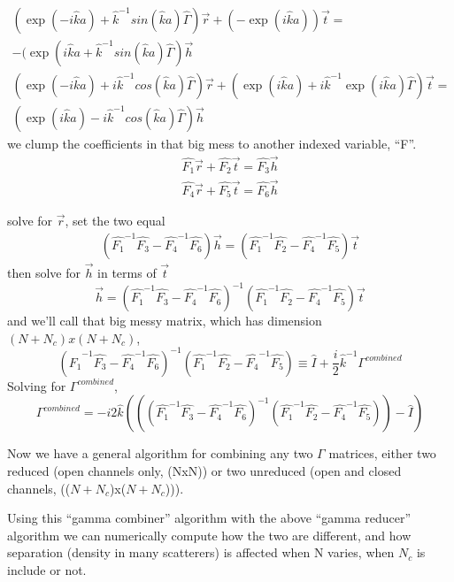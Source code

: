 \begin{equation}
\begin{gathered}
(\exp(-i \hat{k} a)+\hat{k}^{-1} sin(\hat{k} a) \hat{\Gamma}) \vec{r} + 
(-\exp(i \hat{k} a)) \vec{t} = \\
-(\exp(i \hat{k} a +\hat{k}^{-1} sin(\hat{k} a) \hat{\Gamma}) \vec{h}\\
(\exp(-i \hat{k} a)+i \hat{k}^{-1} cos(\hat{k} a) \hat{\Gamma}) \vec{r} + 
(\exp(i \hat{k} a)+i \hat{k}^{-1} \exp(i \hat{k} a) \hat{\Gamma}) \vec{t} = \\
(\exp(i \hat{k} a)-i \hat{k}^{-1} cos(\hat{k} a) \hat{\Gamma}) \vec{h}
\end{gathered}
\end{equation}
we clump the coefficients in that big mess to another indexed variable, ``F''.
\begin{equation}
\begin{gathered}
\hat{F_1} \vec{r}+\hat{F_2} \vec{t}=\hat{F_3} \vec{h} \\
\hat{F_4} \vec{r}+\hat{F_5} \vec{t}=\hat{F_6} \vec{h}
\end{gathered}
\end{equation}

solve for $\vec{r}$, set the two equal
\begin{equation}
\begin{gathered}
(\hat{F_1}^{-1} \hat{F_3}-\hat{F_4}^{-1} \hat{F_6}) \vec{h} = 
(\hat{F_1}^{-1} \hat{F_2}-\hat{F_4}^{-1} \hat{F_5}) \vec{t}
\end{gathered}
\end{equation}
then solve for $\vec{h}$ in terms of $\vec{t}$
\begin{equation}
\vec{h} = (\hat{F_1}^{-1} \hat{F_3} - \hat{F_4}^{-1} \hat{F_6})^{-1}
(\hat{F_1}^{-1} \hat{F_2} - \hat{F_4}^{-1} \hat{F_5}) \vec{t}
\end{equation}
and we'll call that big messy matrix, which has dimension $(N+N_c)x(N+N_c)$,
\begin{equation}
(\hat{F_1}^{-1} \hat{F_3} - \hat{F_4}^{-1} \hat{F_6})^{-1}
(\hat{F_1}^{-1} \hat{F_2} - \hat{F_4}^{-1} \hat{F_5}) \equiv
\hat{I}+\frac{i}{2}\hat{k}^{-1}\Gamma^{combined}
\end{equation}
Solving for $\Gamma^{combined}$, 
\begin{equation}
\Gamma^{combined} = -i 2\hat{k}(((\hat{F_1}^{-1} \hat{F_3} - \hat{F_4}^{-1} \hat{F_6})^{-1}
(\hat{F_1}^{-1} \hat{F_2} - \hat{F_4}^{-1} \hat{F_5})) - \hat{I})
\end{equation}

Now we have a general algorithm for combining any two $\Gamma$ matrices, either two reduced (open channels only, (NxN)) or two unreduced (open and closed channels, (($N+N_c$)x($N+N_c$))). 

Using this ``gamma combiner'' algorithm with the above ``gamma reducer'' algorithm we can numerically compute how the two are different, and how separation (density in many scatterers) is affected when N varies, when $N_c$ is include or not.
